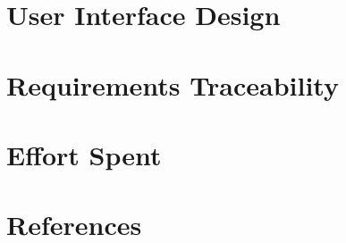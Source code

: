 \documentclass[english]{article}
\begin{document}
\section{User Interface Design}%
\section{Requirements Traceability} %
\section{Effort Spent} %
\section{References}
\end{document}
